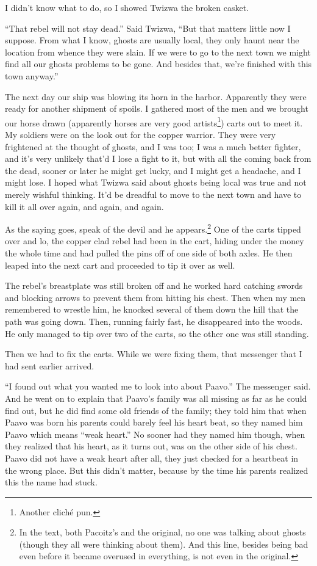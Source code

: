 I didn't know what to do, so I showed Twizwa the broken casket.

``That rebel will not stay dead.'' Said Twizwa, ``But that matters little now I suppose. From what I know, ghosts are usually local, they only haunt near the location from whence they were slain. If we were to go to the next town we might find all our ghosts problems to be gone. And besides that, we're finished with this town anyway.''

\tbreak

The next day our ship was blowing its horn in the harbor. Apparently they were ready for another shipment of spoils. I gathered most of the men and we brought our horse drawn (apparently horses are very good artists\footnote{Another clich\'{e} pun.}) carts out to meet it. My soldiers were on the look out for the copper warrior. They were very frightened at the thought of ghosts, and I was too; I was a much better fighter, and it's very unlikely that'd I lose a fight to it, but with all the coming back from the dead, sooner or later he might get lucky, and I might get a headache, and I might lose. I hoped what Twizwa said about ghosts being local was true and not merely wishful thinking. It'd be dreadful to move to the next town and have to kill it all over again, and again, and again.

As the saying goes, speak of the devil and he appears.\footnote{In the text, both Pacoitz's and the original, no one was talking about ghosts (though they all were thinking about them). And this line, besides being bad even before it became overused in everything, is not even in the original.} One of the carts tipped over and lo, the copper clad rebel had been in the cart, hiding under the money the whole time and had pulled the pins off of one side of both axles. He then leaped into the next cart and proceeded to tip it over as well.

The rebel's breastplate was still broken off and he worked hard catching swords and blocking arrows to prevent them from hitting his chest. Then when my men remembered to wrestle him, he knocked several of them down the hill that the path was going down. Then, running fairly fast, he disappeared into the woods. He only managed to tip over two of the carts, so the other one was still standing.

Then we had to fix the carts. While we were fixing them, that messenger that I had sent earlier arrived.

``I found out what you wanted me to look into about Paavo.'' The messenger said. And he went on to explain that Paavo's family was all missing as far as he could find out, but he did find some old friends of the family; they told him that when Paavo was born his parents could barely feel his heart beat, so they named him Paavo which means ``weak heart.'' No sooner had they named him though, when they realized that his heart, as it turns out, was on the other side of his chest. Paavo did not have a weak heart after all, they just checked for a heartbeat in the wrong place. But this didn't matter, because by the time his parents realized this the name had stuck.

